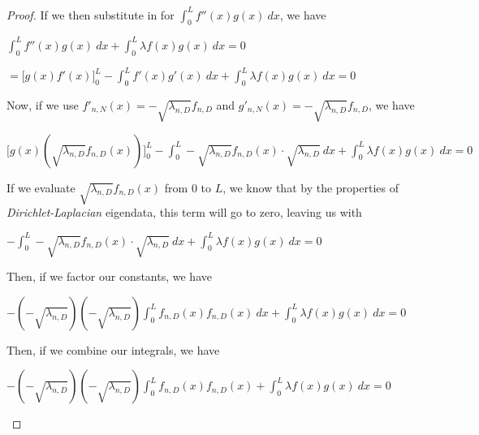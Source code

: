 \documentclass[executivepaper]{article}
\begin{document}
\begin{flushleft}
\begin{proof}
If we then substitute in for  $\int_{0}^{L} f''(x)g(x) \ dx$, we have

\begin{center}

$\int_{0}^{L} f''(x)g(x) \ dx + \int_{0}^{L} \lambda f(x)g(x) \ dx=0$

\vspace{2mm}

$=\bigg[g(x)f'(x)\bigg]_{0}^{L} - \int_{0}^{L} f'(x)g'(x) \ dx + \int_{0}^{L} \lambda f(x)g(x) \ dx=0$

\end{center}

Now, if we use $f'_{n, N}(x)=-\sqrt{\lambda_{n, D}} f_{n, D}$ and $g'_{n, N}(x)=-\sqrt{\lambda_{n, D}} f_{n, D}$, we have

\begin{center}

$\bigg[g(x) (\sqrt{\lambda_{n, D}} f_{n, D}(x))\bigg]_{0}^{L} - \int_{0}^{L} - \sqrt{\lambda_{n, D}} f_{n, D}(x) \cdot \sqrt{\lambda_{n, D}} \ dx + \int_{0}^{L} \lambda f(x)g(x) \ dx=0$

\end{center}

If we evaluate $\sqrt{\lambda_{n, D}} f_{n, D}(x)$ from $0$ to $L$, we know that by the properties of \textit{Dirichlet-Laplacian} eigendata, this term will go to zero, leaving us with

\begin{center}

$- \int_{0}^{L} - \sqrt{\lambda_{n, D}} f_{n, D}(x) \cdot \sqrt{\lambda_{n, D}} \ dx + \int_{0}^{L} \lambda f(x)g(x) \ dx=0$

\end{center}

Then, if we factor our constants, we have

\begin{center}

$-(-\sqrt{\lambda_{n, D}})(-\sqrt{\lambda_{n, D}}) \int_{0}^{L} f_{n,D}(x) f_{n, D}(x) \ dx + \int_{0}^{L} \lambda f(x)g(x) \ dx=0$

\end{center}

Then, if we combine our integrals, we have

\begin{center}

$-(-\sqrt{\lambda_{n, D}})(-\sqrt{\lambda_{n, D}}) \int_{0}^{L} f_{n,D}(x) f_{n, D}(x) +  \int_{0}^{L} \lambda f(x)g(x) \ dx=0$


\end{center}
\end{proof}
\end{flushleft}
\end{document}
